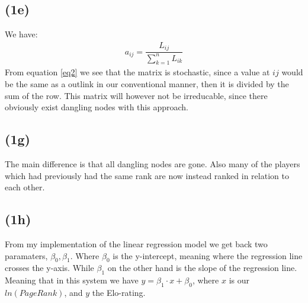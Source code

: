 \documentclass[12pt, letterpaper]{article}
\begin{document}
    \subsection*{(1e)}
      We have:
      \begin{align} \label{eq2}
        a_{ij} = \dfrac{L_{ij}}{\sum_{k=1}^{n}L_{ik}}
      \end{align}
      From equation \ref{eq2} we see that the matrix is stochastic, since a value at $ij$ would be the same as a outlink in our conventional manner, then it is divided by the sum of the row. This matrix will however not be irreducable, since there obviously exist dangling nodes with this approach.
    \subsection*{(1g)}
      The main difference is that all dangling nodes are gone. Also many of the players which had previously had the same rank are now instead ranked in relation to each other.
    \subsection*{(1h)}
      From my implementation of the linear regression model we get back two paramaters, $\beta_0, \beta_1$. Where $\beta_0$ is the y-intercept, meaning where the regression line crosses the y-axis. While $\beta_1$ on the other hand is the slope of the regression line. Meaning that in this system we have $y = \beta_1 \cdot x + \beta_0$, where $x$ is our $ln(PageRank)$, and $y$ the Elo-rating.
\end{document}
